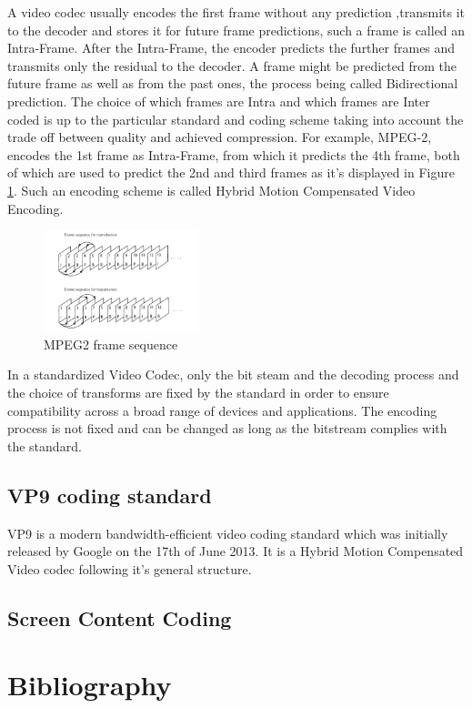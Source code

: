 \documentclass[a4paper,11pt,oneside]{article}
\begin{document}
\clearpage
\indent A video codec usually encodes the first frame without any prediction ,transmits it to the decoder and stores it for future frame predictions, such a frame is called an Intra-Frame. After the Intra-Frame, the encoder predicts the further frames and transmits only the residual to the decoder. A frame might be predicted from the future frame as well as from the past ones, the process being called Bidirectional prediction. The choice of which frames are Intra and which frames are Inter coded is up to the particular standard and coding scheme taking into account the trade off between quality and achieved compression. For example, MPEG-2, encodes the 1st frame as Intra-Frame, from which it predicts the 4th frame, both of which are used to predict the 2nd and third frames as it's displayed in Figure \ref{figure:mpeg2_frame_sequence}. Such an encoding scheme is called Hybrid Motion Compensated Video Encoding.\\ 
\begin{figure}[h]
  \centering
  \includegraphics[width=0.4\textwidth]{../figures/frame_sequence_mpeg2.pdf}
  \caption{MPEG2 frame sequence \cite[pp.98]{dsp_henkel}}
  \label{figure:mpeg2_frame_sequence}
\end{figure} 
\indent In a standardized Video Codec, only the bit steam and the decoding process and the choice of transforms are fixed by the standard in order to ensure compatibility across a broad range of devices and applications. The encoding process is not fixed and can be changed as long as the bitstream complies with the standard.      \cite{vsp_coursera} 

\subsection{VP9 coding standard}
VP9 is a modern bandwidth-efficient video coding standard which was initially released by Google on the 17th of June 2013. It is a Hybrid Motion Compensated Video codec following it's general structure.  

\subsection{Screen Content Coding}






\newpage
\section*{Bibliography}
\printbibliography
\end{document}
